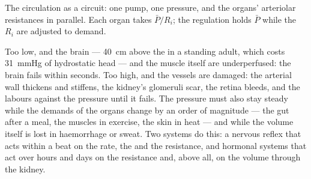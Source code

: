 \begin{omfigure}

{\small The circulation as a circuit: one pump, one pressure, and
the organs' arteriolar resistances in parallel. Each organ takes
$\bar P/R_i$; the regulation holds $\bar P$ while the $R_i$ are
adjusted to demand.}
\end{omfigure}

\begin{proposition}\label{prop:b2:blood-pressure:why}
Too low, and the brain --- \qty{40}{cm} above the  in a standing
adult, which costs \qty{31}{mmHg} of hydrostatic head --- and the
 muscle itself are underperfused: the brain fails within
seconds. Too high, and the vessels are damaged: the arterial wall
thickens and stiffens, the kidney's glomeruli scar, the retina
bleeds, and the  labours against the pressure until it fails.
The pressure must also stay steady while the demands of the organs
change by an order of magnitude --- the gut after a meal, the muscles
in exercise, the skin in heat --- and while the  volume itself
is lost in haemorrhage or sweat. Two systems do this: a nervous
reflex that acts within a beat on the rate, the  and
the resistance, and hormonal systems that act over hours and days
on the resistance and, above all, on the  volume through the
kidney.
\end{proposition}

